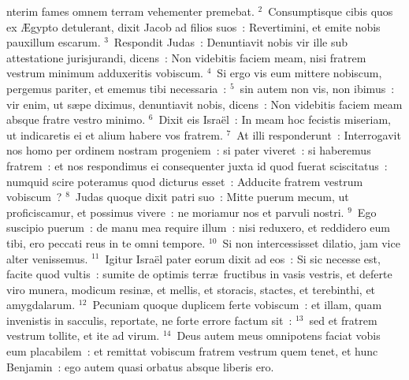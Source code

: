 \bchapter
{}nterim fames omnem terram vehementer premebat.
${}^{2}$~Consumptisque cibis quos ex \AE gypto detulerant, dixit Jacob ad filios suos~: Revertimini, et emite nobis pauxillum escarum.
${}^{3}$~Respondit Judas~: Denuntiavit nobis vir ille sub attestatione jurisjurandi, dicens~: Non videbitis faciem meam, nisi fratrem vestrum minimum adduxeritis vobiscum.
${}^{4}$~Si ergo vis eum mittere nobiscum, pergemus pariter, et ememus tibi necessaria~:
${}^{5}$~sin autem non vis, non ibimus~: vir enim, ut s\ae pe diximus, denuntiavit nobis, dicens~: Non videbitis faciem meam absque fratre vestro minimo.
${}^{6}$~Dixit eis Isra\"el~: In meam hoc fecistis miseriam, ut indicaretis ei et alium habere vos fratrem.
${}^{7}$~At illi responderunt~: Interrogavit nos homo per ordinem nostram progeniem~: si pater viveret~: si haberemus fratrem~: et nos respondimus ei consequenter juxta id quod fuerat sciscitatus~: numquid scire poteramus quod dicturus esset~: Adducite fratrem vestrum vobiscum~?
${}^{8}$~Judas quoque dixit patri suo~: Mitte puerum mecum, ut proficiscamur, et possimus vivere~: ne moriamur nos et parvuli nostri.
${}^{9}$~Ego suscipio puerum~: de manu mea require illum~: nisi reduxero, et reddidero eum tibi, ero peccati reus in te omni tempore.
${}^{10}$~Si non intercessisset dilatio, jam vice alter venissemus.
${}^{11}$~Igitur Isra\"el pater eorum dixit ad eos~: Si sic necesse est, facite quod vultis~: sumite de optimis terr\ae\ fructibus in vasis vestris, et deferte viro munera, modicum resin\ae , et mellis, et storacis, stactes, et terebinthi, et amygdalarum.
${}^{12}$~Pecuniam quoque duplicem ferte vobiscum~: et illam, quam invenistis in sacculis, reportate, ne forte errore factum sit~:
${}^{13}$~sed et fratrem vestrum tollite, et ite ad virum.
${}^{14}$~Deus autem meus omnipotens faciat vobis eum placabilem~: et remittat vobiscum fratrem vestrum quem tenet, et hunc Benjamin~: ego autem quasi orbatus absque liberis ero.


